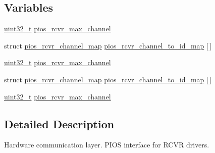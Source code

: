 \subsection*{Variables}
\begin{DoxyCompactItemize}
\item 
\hyperlink{stdint_8h_a435d1572bf3f880d55459d9805097f62}{uint32\-\_\-t} \hyperlink{group___p_i_o_s___r_c_v_r_gafc878e038b0988e158d4bf4c2810faa1}{pios\-\_\-rcvr\-\_\-max\-\_\-channel}
\item 
struct \hyperlink{structpios__rcvr__channel__map}{pios\-\_\-rcvr\-\_\-channel\-\_\-map} \hyperlink{group___p_i_o_s___r_c_v_r_ga38b9bea4834fc5e797204f8ea4a2dead}{pios\-\_\-rcvr\-\_\-channel\-\_\-to\-\_\-id\-\_\-map} \mbox{[}$\,$\mbox{]}
\item 
\hyperlink{stdint_8h_a435d1572bf3f880d55459d9805097f62}{uint32\-\_\-t} \hyperlink{group___p_i_o_s___r_c_v_r_gafc878e038b0988e158d4bf4c2810faa1}{pios\-\_\-rcvr\-\_\-max\-\_\-channel}
\item 
struct \hyperlink{structpios__rcvr__channel__map}{pios\-\_\-rcvr\-\_\-channel\-\_\-map} \hyperlink{group___p_i_o_s___r_c_v_r_ga38b9bea4834fc5e797204f8ea4a2dead}{pios\-\_\-rcvr\-\_\-channel\-\_\-to\-\_\-id\-\_\-map} \mbox{[}$\,$\mbox{]}
\item 
\hyperlink{stdint_8h_a435d1572bf3f880d55459d9805097f62}{uint32\-\_\-t} \hyperlink{group___p_i_o_s___r_c_v_r_gafc878e038b0988e158d4bf4c2810faa1}{pios\-\_\-rcvr\-\_\-max\-\_\-channel}
\end{DoxyCompactItemize}


\subsection{Detailed Description}
Hardware communication layer. P\-I\-O\-S interface for R\-C\-V\-R drivers.

